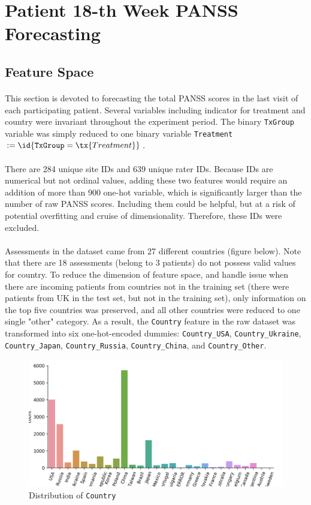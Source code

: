 \documentclass[11pt]{article}
\begin{document}
	\section{Patient 18-th Week PANSS Forecasting}
	\subsection{Feature Space}
	\paragraph{} This section is devoted to forecasting the total PANSS scores in the last visit of each participating patient. Several variables including indicator for treatment and country were invariant throughout the experiment period. The binary \texttt{TxGroup} variable was simply reduced to one binary variable \texttt{Treatment} $:= \id{\texttt{TxGroup} = \tx{Treatment}}$.
	
	\paragraph{} There are 284 unique site IDs and 639 unique rater IDs. Because IDs are numerical but not ordinal values, adding these two features would require an addition of more than 900 one-hot variable, which is significantly larger than the number of raw PANSS scores. Including them could be helpful, but at a risk of potential overfitting and cruise of dimensionality. Therefore, these IDs were excluded.
	\paragraph{} Assessments in the dataset came from 27 different countries (figure below). Note that there are 18 assessments (belong to 3 patients) do not possess valid values for country. To reduce the dimension of feature space, and handle issue when there are incoming patients from countries not in the training set (there were patients from UK in the test set, but not in the training set), only information on the top five countries was preserved, and all other countries were reduced to one single "other" category. As a result, the \texttt{Country} feature in the raw dataset was transformed into six one-hot-encoded dummies: \texttt{Country\_USA}, \texttt{Country\_Ukraine}, \texttt{Country\_Japan}, \texttt{Country\_Russia}, \texttt{Country\_China}, and \texttt{Country\_Other}.
	\begin{figure}[H]
		\centering
		\includegraphics[width=0.7\linewidth]{figures/dist_country.png}
		\caption{Distribution of \texttt{Country}}
	\end{figure}
	
\end{document}
